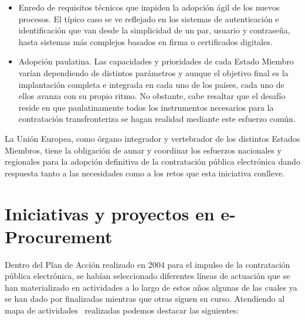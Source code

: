 \begin{itemize}
\item Enredo de requisitos técnicos que impiden la adopción ágil de los nuevos procesos. El típico
caso se ve reflejado en los sistemas de autenticación e identificación que van desde la simplicidad de un 
par, usuario y contraseña, hasta sistemas más complejos basados en firma o certificados
digitales. 

\item Adopción paulatina. Las capacidades y prioridades de cada Estado Miembro varían dependiendo
de distintos parámetros y aunque el objetivo final es la implantación completa e integrada en cada
uno de los países, cada uno de ellos avanza con su propio ritmo. No obstante, cabe resaltar
que el desafío reside en que paulatinamente todos los instrumentos necesarios para la contratación
transfronteriza se hagan realidad mediante este esfuerzo común.
\end{itemize}

La Unión Europea, como órgano integrador y vertebrador de los distintos Estados Miembros, tiene la obligación
de aunar y coordinar los esfuerzos nacionales y regionales para la adopción definitiva de la contratación
pública electrónica dando respuesta tanto a las necesidades como a los retos que esta iniciativa conlleve.

\section{Iniciativas y proyectos en e-Procurement}
Dentro del Plan de Acción realizado en 2004 para el impulso de la contratación pública electrónica, se habían
seleccionado diferentes líneas de actuación que se han materializado en actividades a lo largo de estos años algunas de las cuales ya se han 
dado por finalizadas mientras que otras siguen su curso. Atendiendo 
al mapa de actividades~\cite{e-Proc-map-paper} realizadas podemos destacar las siguientes:

